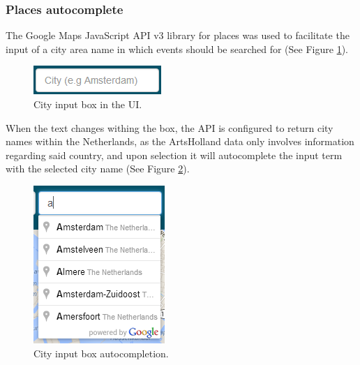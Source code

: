 \documentclass[hidelinks,a4paper]{article}
\begin{document}
\subsubsection{Places autocomplete}
The Google Maps JavaScript API v3 library for places \cite{google_places} was used to facilitate the input of a city area name in which events should be searched for (See Figure \ref{fig:location_input}). 

\begin{figure}[h!]
  \centering
    \includegraphics[]{images/autocomplete_1.png}    
    \caption{City input box in the UI.}
    \label{fig:location_input}
\end{figure}

When the text changes withing the box, the API is configured to return city names within the Netherlands, as the ArtsHolland data only involves information regarding said country, and upon selection it will autocomplete the input term with the selected city name (See Figure \ref{fig:location_autocomplete}).

\begin{figure}[h!]
  \centering
    \includegraphics[]{images/autocomplete_2.png}    
    \caption{City input box autocompletion.}
    \label{fig:location_autocomplete}
\end{figure}
\end{document}
